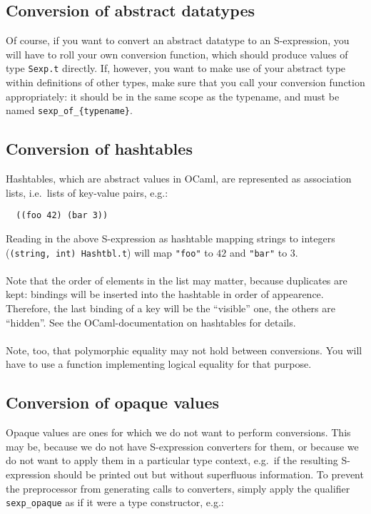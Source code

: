 \documentclass[a4paper]{article}
\begin{document}
\subsection{Conversion of abstract datatypes}

Of course, if you want to convert an abstract datatype to an S-expression,
you will have to roll your own conversion function, which should produce
values of type \verb=Sexp.t= directly.  If, however, you want to make
use of your abstract type within definitions of other types, make sure
that you call your conversion function appropriately: it should be in the
same scope as the typename, and must be named \verb=sexp_of_{typename}=.

\subsection{Conversion of hashtables}

Hashtables, which are abstract values in OCaml, are represented as
association lists, i.e.\ lists of key-value pairs, e.g.:

\begin{verbatim}
  ((foo 42) (bar 3))
\end{verbatim}

Reading in the above S-expression as hashtable mapping strings to
integers (\verb=(string, int) Hashtbl.t=) will map \verb="foo"= to $42$
and \verb="bar"= to $3$.\\
\\
Note that the order of elements in the list may matter, because
duplicates are kept: bindings will be inserted into the hashtable in
order of appearence.  Therefore, the last binding of a key will be the
``visible'' one, the others are ``hidden''.  See the OCaml-documentation
on hashtables for details.\\
\\
Note, too, that polymorphic equality may not hold between conversions.
You will have to use a function implementing logical equality for that
purpose.

\subsection{Conversion of opaque values}

Opaque values are ones for which we do not want to perform conversions.
This may be, because we do not have S-expression converters for them,
or because we do not want to apply them in a particular type context,
e.g.\ if the resulting S-expression should be printed out but without
superfluous information.  To prevent the preprocessor from generating
calls to converters, simply apply the qualifier \verb=sexp_opaque=
as if it were a type constructor, e.g.:
\end{document}
